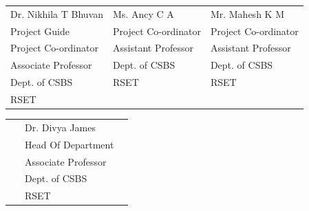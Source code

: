 \begin{flushleft}


	\begin{longtable}{p{5.8cm} p{5.8cm} p{5.8cm}}
		{Dr. Nikhila T Bhuvan} & {Ms. Ancy C A}         & {Mr. Mahesh K M}       \\
		{Project Guide}        & {Project Co-ordinator} & {Project Co-ordinator} \\
		{Project Co-ordinator} & {Assistant Professor}  & {Assistant Professor}  \\
		{Associate Professor}  & {Dept. of CSBS}        & {Dept. of CSBS}        \\
		{Dept. of CSBS}        & {RSET}                 & {RSET}                 \\
		{RSET} ~               & {}                     & {}                     \\
	\end{longtable}
\end{flushleft}
\vspace{2cm}

\begin{flushleft}


	\begin{longtable}{p{5.8cm} p{5.8cm} p{5.8cm}}

		{}   & {Dr. Divya James}     & {} \\
		{}   & {Head Of Department}  & {} \\
		{}   & {Associate Professor} & {} \\
		{}   & {Dept. of CSBS}       & {} \\
		{} ~ & {RSET}                & {} \\
	\end{longtable}
\end{flushleft}


%	
%	
%		
